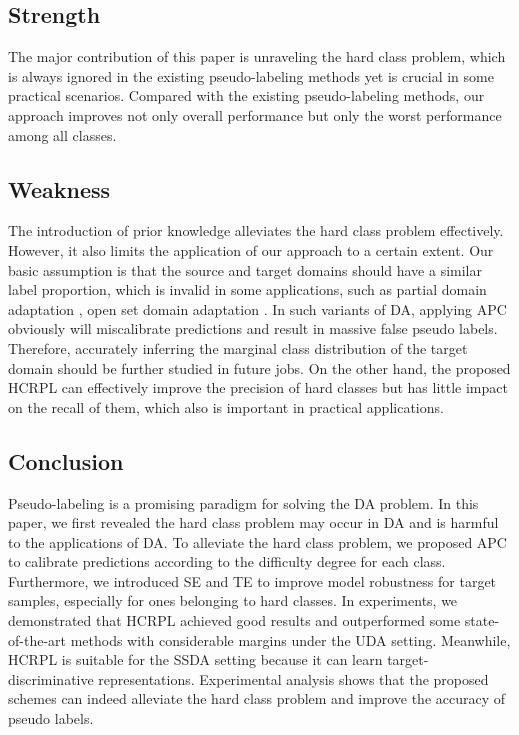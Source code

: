 \documentclass[a4paper,fleqn]{cas-dc}
\begin{document}
	{\subsection{Strength}}
	{The major contribution of this paper is unraveling the hard class problem, which is always ignored in the existing pseudo-labeling methods yet is crucial in some practical scenarios. Compared with the existing pseudo-labeling methods, our approach improves not only overall performance but only the worst performance among all classes.}
	
	{\subsection{Weakness}}
	{The introduction of prior knowledge alleviates the hard class problem effectively. However, it also limits the application of our approach to a certain extent. Our basic assumption is that the source and target domains should have a similar label proportion, which is invalid in some applications, such as partial domain adaptation \cite{cao2018partial}, open set domain adaptation \cite{panareda2017open}. In such variants of DA, applying APC obviously will miscalibrate predictions and result in massive false pseudo labels. Therefore, accurately inferring the marginal class distribution of the target domain should be further studied in future jobs. On the other hand, the proposed HCRPL can effectively improve the precision of hard classes but has little impact on the recall of them, which also is important in practical applications.}
	
	
	\subsection{Conclusion}
	Pseudo-labeling is a promising paradigm for solving the DA problem. In this paper, we first revealed the hard class problem may occur in DA and is harmful to the applications of DA. To alleviate the hard class problem, we proposed APC to calibrate predictions according to the difficulty degree for each class. Furthermore, we introduced SE and TE to improve model robustness for target samples, especially for ones belonging to hard classes. In experiments, we demonstrated that HCRPL achieved good results and outperformed some state-of-the-art methods with considerable margins under the UDA setting. Meanwhile, HCRPL is suitable for the SSDA setting because it can learn target-discriminative representations. Experimental analysis shows that the proposed schemes can indeed alleviate the hard class problem and improve the accuracy of pseudo labels. 
	
\end{document}
